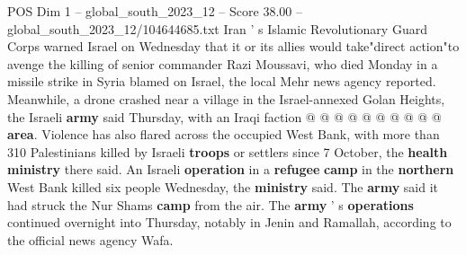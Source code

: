 \begin{textsample}{POS Dim 1 – global\_south\_2023\_12 – Score 38.00 – global\_south\_2023\_12/104644685.txt}
Iran ' s Islamic Revolutionary Guard Corps warned Israel on Wednesday that it or its allies would take"direct action"to avenge the killing of senior commander Razi Moussavi, who died Monday in a missile strike in Syria blamed on Israel, the local Mehr news agency reported.
Meanwhile, a drone crashed near a village in the Israel-annexed Golan Heights, the Israeli \textbf{army} said Thursday, with an Iraqi faction @ @ @ @ @ @ @ @ @ @ \textbf{area}.
Violence has also flared across the occupied West Bank, with more than 310 Palestinians killed by Israeli \textbf{troops} or settlers since 7 October, the \textbf{health} \textbf{ministry} there said.
An Israeli \textbf{operation} in a \textbf{refugee} \textbf{camp} in the \textbf{northern} West Bank killed six people Wednesday, the \textbf{ministry} said.
The \textbf{army} said it had struck the Nur Shams \textbf{camp} from the air.
The \textbf{army} ' s \textbf{operations} continued overnight into Thursday, notably in Jenin and Ramallah, according to the official news agency Wafa.

\end{textsample}
